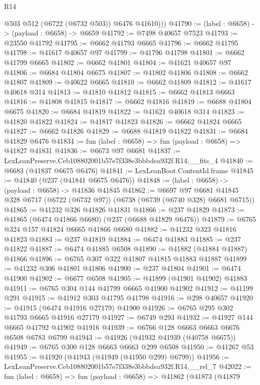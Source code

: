 \begin{lexlean}{R14}
\begin{coremodule}
          @503
          @512
          (@6722 (@6732 @503))
          @6476
          @41610)))
@41790 := (label : @6658) -> (payload : @6658) -> @6659
@41792 := @7498 @40657 @7523
@41793 := @23550 @41792
@41795 := @6662 @41793 @6665
@41796 := @6662 @41795
@41798 := @41617 @40657 @97
@41799 := @41796 @41798
@41801 := @6662 @41799 @6665
@41802 := @6662 @41801
@41804 := @41621 @40657 @97
@41806 := @6684 @41804 @6675
@41807 := @41802 @41806
@41808 := @6662 @41807
@41809 := @40622 @6665
@41810 := @6662 @41809
@41812 := @41617 @40618 @314
@41813 := @41810 @41812
@41815 := @6662 @41813 @6663
@41816 := @41808 @41815
@41817 := @6662 @41816
@41819 := @6688 @41804 @6675
@41820 := @6684 @41819
@41822 := @41621 @40618 @314
@41823 := @41820 @41822
@41824 := @41817 @41823
@41826 := @6662 @41824 @6665
@41827 := @6662 @41826
@41829 := @6688 @41819 @41822
@41831 := @6684 @41829 @6476
@41834 := fun (label : @6658) => fun (payload : @6658) => @41827 @41831
@41836 := @6673 @97 @6681
@41837 := LexLeanPreserve.Ceb108802001b57e7f338e3bbbdea932f.R14.__fits_4
@41840 := @6683 (@41837 @6675 @6476)
@41841 := LexLeanBoot.ContentId.frame
@41845 := @41840 (@237 (@41841 @6675 @6476))
@41848 := (label : @6658) -> (payload : @6658) -> @41836 @41845
@41862 := @6697
    @97
    @6681
    @41845
    @328
    @6717
    (@6722 (@6732 @97))
    (@6738 (@6739 (@6740 @328) @6681 @6715))
@41865 := @41232 @326 @41826 @41831
@41866 := @237 @41829
@41873 := @41865 (@6474 @41866 @6680) (@237 (@6688 @41829 @6476))
@41879 := @6765 @324 @157 @41824 @6665 @41866 @6680
@41882 := @41232 @323 @41816 @41823
@41883 := @237 @41819
@41884 := @6474 @41883
@41885 := @237 @41822
@41887 := @6474 @41885 @6508
@41890 := @41882 (@41884 @41887) @41866
@41896 := @6765 @307 @322 @41807 @41815 @41883 @41887
@41899 := @41232 @306 @41801 @41806
@41900 := @237 @41804
@41901 := @6474 @41900
@41902 := @6677 @6508
@41905 := @41899 (@41901 @41902) @41883
@41911 := @6765 @304 @144 @41799 @6665 @41900 @41902
@41912 := @41199 @291
@41915 := @41912 @303 @41795 @41798
@41916 := @298 @40657
@41920 := @41915 (@6474 @41916 @27179) @41900
@41926 := @6765 @295 @302 @41793 @6665 @41916 @27179
@41927 := @6749 @293
@41932 := @41927 @144 @6665 @41792 @41902 @41916
@41939 := @6766 @128 @6663 @6663 @6676 @6508 @6783 @6799
@41943 := @41926 (@41932 @41939 (@40758 @6675))
@41949 := @6765 @300 @128 @6663 @6663 @299 @6508
@41950 := @41267 @53
@41955 := @41920 (@41943 (@41949 (@41950 @299) @6799))
@41956 := LexLeanPreserve.Ceb108802001b57e7f338e3bbbdea932f.R14.__rel_7
@42022 := fun (label : @6658) =>
  fun (payload : @6658) =>
  @41862
    (@41873
      (@41879

\end{coremodule}
\end{lexlean}
